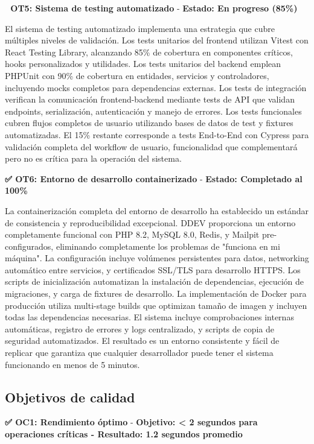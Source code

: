 \documentclass[12pt,a4paper,oneside]{report}
\begin{document}
\textbf{🔄 OT5: Sistema de testing automatizado} - \textbf{Estado: En progreso (85\%)}

El sistema de testing automatizado implementa una estrategia que cubre múltiples niveles de validación. Los tests unitarios del frontend utilizan Vitest con React Testing Library, alcanzando 85\% de cobertura en componentes críticos, hooks personalizados y utilidades. Los tests unitarios del backend emplean PHPUnit con 90\% de cobertura en entidades, servicios y controladores, incluyendo mocks completos para dependencias externas. Los tests de integración verifican la comunicación frontend-backend mediante tests de API que validan endpoints, serialización, autenticación y manejo de errores. Los tests funcionales cubren flujos completos de usuario utilizando bases de datos de test y fixtures automatizadas. El 15\% restante corresponde a tests End-to-End con Cypress para validación completa del workflow de usuario, funcionalidad que complementará pero no es crítica para la operación del sistema.

\textbf{✅ OT6: Entorno de desarrollo containerizado} - \textbf{Estado: Completado al 100\%}

La containerización completa del entorno de desarrollo ha establecido un estándar de consistencia y reproducibilidad excepcional. DDEV proporciona un entorno completamente funcional con PHP 8.2, MySQL 8.0, Redis, y Mailpit pre-configurados, eliminando completamente los problemas de "funciona en mi máquina". La configuración incluye volúmenes persistentes para datos, networking automático entre servicios, y certificados SSL/TLS para desarrollo HTTPS. Los scripts de inicialización automatizan la instalación de dependencias, ejecución de migraciones, y carga de fixtures de desarrollo. La implementación de Docker para producción utiliza multi-stage builds que optimizan tamaño de imagen y incluyen todas las dependencias necesarias. El sistema incluye comprobaciones internas automáticas, registro de errores y logs centralizado, y scripts de copia de seguridad automatizados. El resultado es un entorno consistente y fácil de replicar que garantiza que cualquier desarrollador puede tener el sistema funcionando en menos de 5 minutos.

\subsection{Objetivos de calidad}\label{objetivos-de-calidad}

\textbf{✅ OC1: Rendimiento óptimo} - \textbf{Objetivo: < 2 segundos para operaciones críticas - Resultado: 1.2 segundos promedio}
\end{document}
